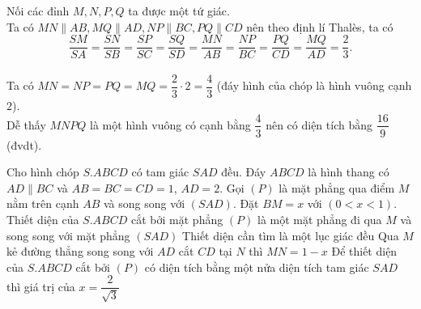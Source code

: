 \begin{ex}
{\begin{itemchoice}
			Nối các đỉnh $M,N,P,Q$  ta được một tứ giác.\\
			Ta có $MN\parallel AB,MQ\parallel AD,NP\parallel BC,PQ\parallel CD$ nên theo định lí Thalès, ta có 
			 \[\dfrac{SM}{SA}=\dfrac{SN}{SB}=\dfrac{SP}{SC}=\dfrac{SQ}{SD}=\dfrac{MN}{AB}=\dfrac{NP}{BC}=\dfrac{PQ}{CD}=\dfrac{MQ}{AD}=\dfrac{2}{3}.
			 \]
			\\
			Ta có $MN=NP=PQ=MQ=\dfrac{2}{3} \cdot  2=\dfrac{4}{3}$ (đáy hình của chóp là hình vuông cạnh $2$).\\
			Dễ thấy $MNPQ$ là một  hình vuông có cạnh bằng $\dfrac{4}{3}$ nên có diện tích bằng $\dfrac{16}{9}$ (đvdt).
		\end{itemchoice}
	} 
\end{ex}

\begin{ex}%
	Cho hình chóp $S.ABCD$ có tam giác $SAD$ đều. Đáy $ABCD$ là hình thang có $AD\parallel BC$ và $AB=BC=CD=1$, $AD=2$. Gọi $(P)$ là mặt phẳng qua điểm $M$  nằm trên cạnh $AB$ và song song với $\left(SAD\right)$. Đặt $BM=x$ với $\left(0 < x < 1\right)$.
	 \choiceTF
		{\True Thiết diện  của $S.ABCD$ cắt bởi mặt phẳng $(P)$ là một mặt phẳng đi qua $M$ và song song với mặt phẳng $\left(SAD\right)$}
		 {Thiết diện cần tìm là một lục giác đều}
		{Qua $M$ kẻ đường thẳng song song với $AD$ cắt $CD$ tại $N$  thì $MN=1-x$}
		{Để thiết diện  của $S.ABCD$ cắt bởi $(P)$ có diện tích bằng một nửa diện tích tam giác $SAD$ thì giá trị của $x=\dfrac{2}{\sqrt 3}$}
\end{ex}
